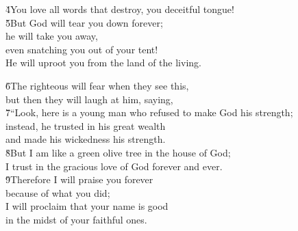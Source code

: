 \begin{poetry}
\poeml \v{4}You love all words that destroy, you deceitful tongue! \\
\poeml \v{5}But God will tear you down forever; \\
\poemll    he will take you away, \\
\poemlll       even snatching you out of your tent! \\
\poeml He will uproot you from the land of the living.
\end{poetry}

\begin{poetry}
\poeml \v{6}The righteous will fear when they see this, \\
\poemll    but then they will laugh at him, saying, \\
\poeml \v{7}``Look, here is a young man who refused to make God his strength; \\
\poemll    instead, he trusted in his great wealth \\
\poemlll       and made his wickedness his strength. \\
\poeml \v{8}But I am like a green olive tree in the house of God; \\
\poemll    I trust in the gracious love of God forever and ever. \\
\poeml \v{9}Therefore I will praise you forever \\
\poemll    because of what you did; \\
\poeml I will proclaim that your name is good \\
\poemll    in the midst of your faithful ones.
\end{poetry}

